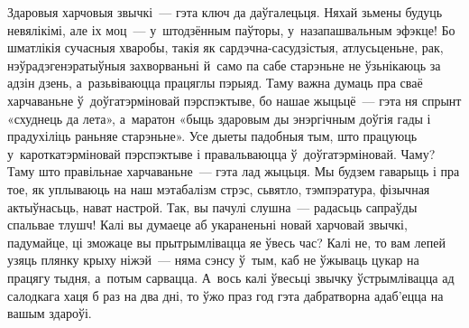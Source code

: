 Здаровыя харчовыя звычкі~--- гэта ключ да даўгалецьця. Няхай зьмены будуць невялікімі, але іх моц~--- у~штодзённым паўторы, у~назапашвальным эфэкце! Бо шматлікія сучасныя хваробы, такія як сардэчна-сасудзістыя, атлусьценьне, рак, нэўрадэгенэратыўныя захворваньні й~само па сабе старэньне не ўзьнікаюць за адзін дзень, а~разьвіваюцца працяглы пэрыяд. Таму важна думаць пра сваё харчаваньне ў~доўгатэрміновай пэрспэктыве, бо нашае жыцьцё~--- гэта ня спрынт «схуднець да лета», а~маратон «быць здаровым ды энэргічным доўгія гады і прадухіліць раньняе старэньне». Усе дыеты падобныя тым, што працуюць у~кароткатэрміновай пэрспэктыве і правальваюцца ў~доўгатэрміновай. Чаму? Таму што правільнае харчаваньне~--- гэта лад жыцьця. Мы будзем гаварыць і пра тое, як уплываюць на наш мэтабалізм стрэс, сьвятло, тэмпэратура, фізычная актыўнасьць, нават настрой. Так, вы пачулі слушна~--- радасьць сапраўды спальвае тлушч! Калі вы думаеце аб укараненьні новай харчовай звычкі, падумайце, ці зможаце вы прытрымлівацца яе ўвесь час? Калі не, то вам лепей узяць плянку крыху ніжэй~--- няма сэнсу ў~тым, каб не ўжываць цукар на працягу тыдня, а~потым сарвацца. А~вось калі ўвесьці звычку ўстрымлівацца ад салодкага хаця б раз на два дні, то ўжо праз год гэта дабратворна адаб'ецца на вашым здароўі.

